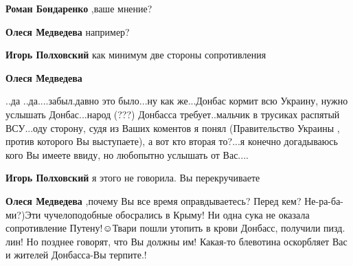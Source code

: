 \begin{itemize}
\begin{itemize}
\textbf{Роман Бондаренко} ,ваше мнение?

 
\textbf{Олеся Медведева} например?

 
\textbf{Игорь Полховский} как минимум две стороны сопротивления

 
\textbf{Олеся Медведева} 

..да ..да....забыл.давно это было...ну как же...Донбас кормит всю Украину,
нужно услышать Донбас...народ (???) Донбасса требует..мальчик в трусиках
распятый ВСУ...оду сторону, судя из Ваших коментов я понял (Правительство
Украины , против которого Вы выступаете), а вот кто вторая то?...я конечно
догадываюсь кого Вы имеете ввиду, но любопытно услышать от Вас....


 
\textbf{Игорь Полховский} я этого не говорила. Вы перекручиваете

 
\textbf{Олеся Медведева} ,почему Вы все время оправдываетесь? Перед кем?
Не-ра-ба-ми?)Эти чучелоподобные обосрались в Крыму! Ни одна сука не оказала
сопротивление Путену!☺Твари пошли утопить в крови Донбасс, получили пизд. лин!
Но позднее говорят, что Вы должны им! Какая-то блевотина оскорбляет Вас и
жителей Донбасса-Вы терпите.!


\end{itemize}
\end{itemize}
